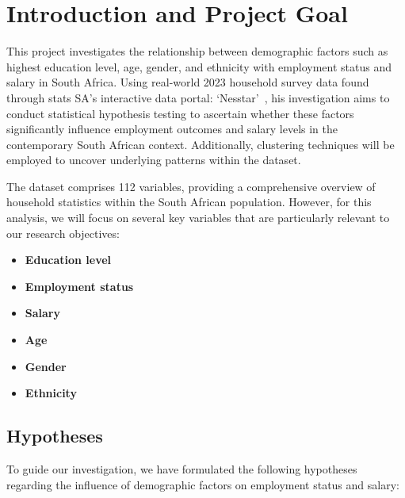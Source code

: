 \section{Introduction and Project Goal}

This project investigates the relationship between demographic factors such as highest education level, age, gender, and ethnicity with employment status and salary in South Africa. 
Using real-world 2023 household survey data found through stats SA's interactive data portal: `Nesstar'~\cite{StatsSA_GHS2023}, his investigation aims to conduct statistical hypothesis testing to ascertain whether these factors significantly influence employment outcomes and salary levels in the contemporary South African context. 
Additionally, clustering techniques will be employed to uncover underlying patterns within the dataset.

The dataset comprises 112 variables, providing a comprehensive overview of household statistics within the South African population. However, for this analysis, we will focus on several key variables that are particularly relevant to our research objectives:
\begin{itemize}
    \item \textbf{Education level}
    \item \textbf{Employment status}
    \item \textbf{Salary}
    \item \textbf{Age}
    \item \textbf{Gender}
    \item \textbf{Ethnicity}
\end{itemize}

\subsection{Hypotheses}
To guide our investigation, we have formulated the following hypotheses regarding the influence of demographic factors on employment status and salary:






